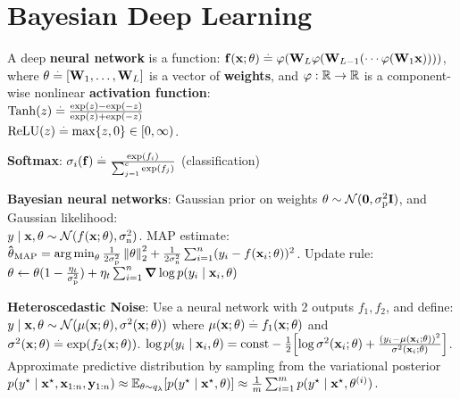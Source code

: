 \section{Bayesian Deep Learning}
\begin{framed}
    A deep \textbf{neural network} is a function: $\mathbf{f}(\mathbf{x}; \mathbf{\theta}) \overset{.}{=} \mathbf{\varphi}(\mathbf{W}_L \mathbf{\varphi}(\mathbf{W}_{L-1} ( \cdots \mathbf{\varphi}(\mathbf{W}_1 \mathbf{x}))))$, where $\mathbf{\theta} \overset{.}{=} [\mathbf{W}_1, \dots, \mathbf{W}_L]$ is a vector of \textbf{weights}, and $\varphi : \mathbb{R} \to \mathbb{R}$ is a component-wise nonlinear \textbf{activation function}:\\
    $\mathrm{Tanh}(z) \overset{.}{=} \frac{\exp(z) - \exp(-z)}{\exp(z) + \exp(-z)}$ \\
    $\mathrm{ReLU}(z) \overset{.}{=} \max \{z, 0\} \in [0, \infty)$.
\end{framed}
\textbf{Softmax}: $\sigma_i(\mathbf{f}) \overset{.}{=} \frac{\exp(f_i)}{\sum_{j=1}^c \exp(f_j)}$ (classification)
\begin{framed}
    \textbf{Bayesian neural networks}: Gaussian prior on weights $\vtheta \sim \N{\vzero}{\sigmap^2 \mI}$, and Gaussian likelihood: \\
    $y \mid \vx, \vtheta \sim \N{f(\vx; \vtheta)}{\sigman^2}$. MAP estimate:\\
    $\vthetahat_\MAP = \argmin_\vtheta \frac{1}{2 \sigmap^2} \norm{\vtheta}_2^2 + \frac{1}{2 \sigman^2} \sum_{i=1}^n (y_i - f(\vx_i; \vtheta))^2$. Update rule: $\vtheta \gets \vtheta(1 - \frac{\eta_t}{\sigmap^2}) + \eta_t \sum_{i=1}^n \grad \log p(y_i \mid \vx_i, \vtheta)$
\end{framed}
\textbf{Heteroscedastic Noise}: Use a neural network with 2 outputs $f_1, f_2$, and define: $y \mid \vx, \vtheta \sim \N{\mu(\vx; \vtheta)}{\sigma^2(\vx; \vtheta)}$ where $\mu(\mathbf{x}; \mathbf{\theta}) \overset{.}{=} f_1(\mathbf{x}; \mathbf{\theta})$ and $\sigma^2(\mathbf{x}; \mathbf{\theta}) \overset{.}{=} \exp(f_2(\mathbf{x}; \mathbf{\theta}))$.
$\log p(y_i \mid \vx_i, \vtheta) = \const - \frac{1}{2} \brackets*{\log \sigma^2(\vx_i; \vtheta) + \frac{(y_i - \mu(\vx_i; \vtheta))^2}{\sigma^2(\vx_i; \vtheta)}}$.
Approximate predictive distribution by sampling from the variational posterior $p(\ys \mid \vxs, \vx_{1:n}, \vy_{1:n}) \approx \E[\theta \sim q_\vlambda]{p(\ys \mid \vxs, \vtheta)}\approx \frac{1}{m} \sum_{i=1}^m p(\ys \mid \vxs, \vtheta^{(i)})$.
